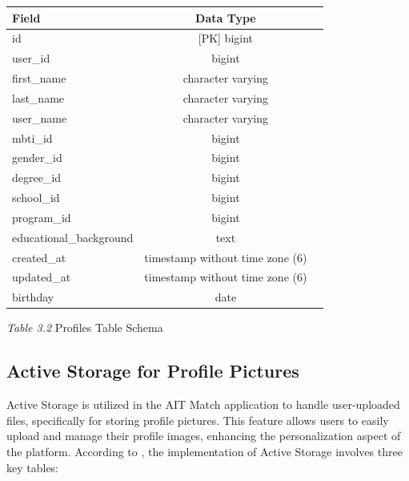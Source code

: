 \begin{enumerate}
    \begin{table}[h!]
    \centering
    \begin{tabular}{lcc}
        \hline
        \textbf{Field}               & \textbf{Data Type}                 \\ \hline
        id                           & [PK] bigint                        \\ 
        user\_id                     & bigint                             \\ 
        first\_name                  & character varying                  \\ 
        last\_name                   & character varying                  \\ 
        user\_name                   & character varying                  \\ 
        mbti\_id                     & bigint                             \\ 
        gender\_id                   & bigint                             \\ 
        degree\_id                   & bigint                             \\ 
        school\_id                   & bigint                             \\ 
        program\_id                  & bigint                             \\ 
        educational\_background      & text                               \\ 
        created\_at                  & timestamp without time zone (6)    \\ 
        updated\_at                  & timestamp without time zone (6)    \\ 
        birthday                     & date                               \\ \hline
    \end{tabular}
    
    \vspace{0.3cm} %
    \small\centerline{\textit{Table 3.2} Profiles Table Schema} %
    \end{table}

    \clearpage
    \subsection{Active Storage for Profile Pictures}
        \bigskip
        Active Storage is utilized in the AIT Match application to handle user-uploaded files, specifically for storing profile pictures. This feature allows users to easily upload and manage their profile images, enhancing the personalization aspect of the platform. According to \cite{rails_active_storage}, the implementation of Active Storage involves three key tables:
        

\end{enumerate}
